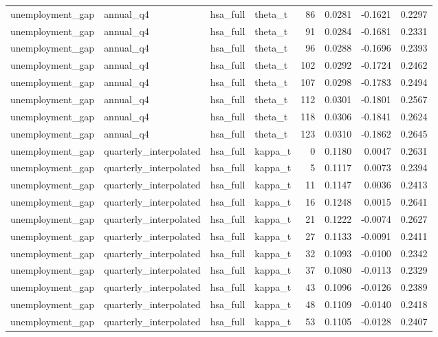 \begin{tabular}{llllrrrr}
unemployment\_gap & annual\_q4 & hsa\_full & theta\_t & 86 & 0.0281 & -0.1621 & 0.2297 \\
unemployment\_gap & annual\_q4 & hsa\_full & theta\_t & 91 & 0.0284 & -0.1681 & 0.2331 \\
unemployment\_gap & annual\_q4 & hsa\_full & theta\_t & 96 & 0.0288 & -0.1696 & 0.2393 \\
unemployment\_gap & annual\_q4 & hsa\_full & theta\_t & 102 & 0.0292 & -0.1724 & 0.2462 \\
unemployment\_gap & annual\_q4 & hsa\_full & theta\_t & 107 & 0.0298 & -0.1783 & 0.2494 \\
unemployment\_gap & annual\_q4 & hsa\_full & theta\_t & 112 & 0.0301 & -0.1801 & 0.2567 \\
unemployment\_gap & annual\_q4 & hsa\_full & theta\_t & 118 & 0.0306 & -0.1841 & 0.2624 \\
unemployment\_gap & annual\_q4 & hsa\_full & theta\_t & 123 & 0.0310 & -0.1862 & 0.2645 \\
unemployment\_gap & quarterly\_interpolated & hsa\_full & kappa\_t & 0 & 0.1180 & 0.0047 & 0.2631 \\
unemployment\_gap & quarterly\_interpolated & hsa\_full & kappa\_t & 5 & 0.1117 & 0.0073 & 0.2394 \\
unemployment\_gap & quarterly\_interpolated & hsa\_full & kappa\_t & 11 & 0.1147 & 0.0036 & 0.2413 \\
unemployment\_gap & quarterly\_interpolated & hsa\_full & kappa\_t & 16 & 0.1248 & 0.0015 & 0.2641 \\
unemployment\_gap & quarterly\_interpolated & hsa\_full & kappa\_t & 21 & 0.1222 & -0.0074 & 0.2627 \\
unemployment\_gap & quarterly\_interpolated & hsa\_full & kappa\_t & 27 & 0.1133 & -0.0091 & 0.2411 \\
unemployment\_gap & quarterly\_interpolated & hsa\_full & kappa\_t & 32 & 0.1093 & -0.0100 & 0.2342 \\
unemployment\_gap & quarterly\_interpolated & hsa\_full & kappa\_t & 37 & 0.1080 & -0.0113 & 0.2329 \\
unemployment\_gap & quarterly\_interpolated & hsa\_full & kappa\_t & 43 & 0.1096 & -0.0126 & 0.2389 \\
unemployment\_gap & quarterly\_interpolated & hsa\_full & kappa\_t & 48 & 0.1109 & -0.0140 & 0.2418 \\
unemployment\_gap & quarterly\_interpolated & hsa\_full & kappa\_t & 53 & 0.1105 & -0.0128 & 0.2407 \\

\end{tabular}

